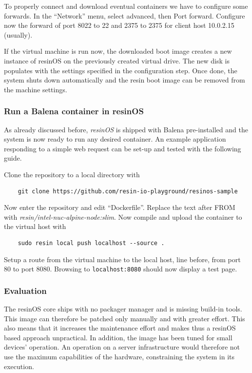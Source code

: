 \documentclass[]{scrartcl}
\begin{document}
To properly connect and download eventual containers we have to configure some forwards. In the ``Network'' menu, select advanced, then Port forward. Configure now the forward of port 8022 to 22  and 2375 to 2375 for client host 10.0.2.15 (usually).

If the virtual machine is run now, the downloaded boot image creates a new instance of resinOS on the previously created virtual drive. The new disk is populates with the settings specified in the configuration step. Once done, the system shuts down automatically and the resin boot image can be removed from the machine settings.

\subsubsection{Run a Balena container in resinOS}

As already discussed before, \textit{resinOS} is shipped with Balena pre-installed and the system is now ready to run any desired container. 
An example application responding to a simple web request can be set-up and tested with the following guide.

Clone the repository to a local directory with
\begin{verbatim}
	git clone https://github.com/resin-io-playground/resinos-sample
\end{verbatim}

Now enter the repository and edit ``Dockerfile''. Replace the text after FROM with \textit{resin/intel-nuc-alpine-node:slim}. Now compile and upload the container to the virtual host with

\begin{verbatim}
	sudo resin local push localhost --source .
\end{verbatim}

Setup a route from the virtual machine to the local host, line before, from port 80 to port 8080. Browsing to \texttt{localhost:8080} should now display a test page.

\subsubsection{Evaluation}

The resinOS core ships with no packager manager and is missing build-in tools. This image can therefore be patched only manually and with greater effort. This also means that it increases the maintenance effort and makes thus a resinOS based approach unpractical. In addition, the image has been tuned for small devices' operation. An operation on a server infrastructure would therefore not use the maximum capabilities of the hardware, constraining the system in its execution.
\end{document}
